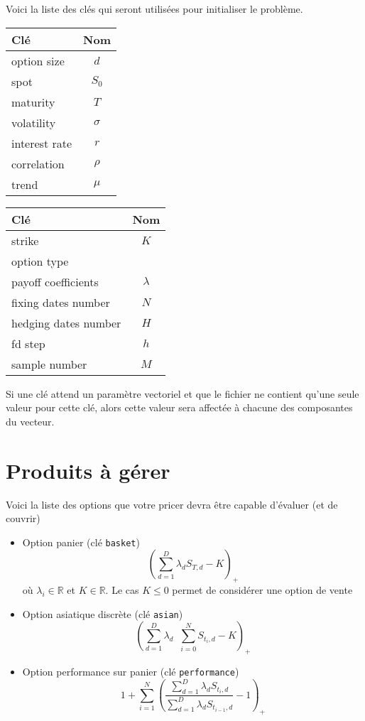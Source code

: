 \documentclass[a4paper,11pt]{article}
\def\R{{\mathbb R}}
\def\inv#1{\mathop{\frac{1}{ #1}}\nolimits}
\begin{document}
Voici la liste des clés qui seront utilisées pour initialiser le problème.
\begin{multicols}{2}
\begin{center}
  \begin{tabular}{l@{$\quad$}|@{$\quad$}c}
    Clé &  Nom\\
    \hline
    option size &  $d$ \\
    spot & $S_0$\\
    maturity & $T$\\
    volatility & $\sigma$\\
    interest rate & $r$ \\
    correlation & $\rho$\\
    trend & $\mu$ \\
  \end{tabular}

  \begin{tabular}{l@{$\quad$}|@{$\quad$}c}
    Clé & Nom\\
    \hline
    strike & $K$\\
    option type & \\
    payoff coefficients &$\lambda$ \\
    fixing dates number &$N$ \\
    hedging dates number &$H$ \\
    fd step &$h$ \\
    sample number &$M$
  \end{tabular}
\end{center}
\end{multicols}
Si une clé attend un paramètre vectoriel et que le fichier ne contient qu'une seule valeur pour cette clé, alors cette valeur sera affectée à chacune des composantes du vecteur.


\section{Produits à gérer}
\label{sec:options}

Voici la liste des options que votre pricer devra être capable d'évaluer (et de couvrir)
\begin{itemize}
\item Option panier (clé \verb!basket!)
  \begin{equation*}
    \left( \sum_{d=1}^D \lambda_d S_{T,d} - K \right)_+
  \end{equation*}
  où $\lambda_i \in \R$ et $K \in \R$. Le cas $K \le 0$ permet de considérer une
  option de vente

\item Option asiatique discrète (clé \verb!asian!)
  \begin{equation*}
    \left(\sum_{d=1}^D \lambda_d \inv{N+1} \sum_{i=0}^{N} S_{t_i,d} - K\right)_+
  \end{equation*}

\item Option performance sur panier (clé \verb!performance!)
  \begin{equation*}
    1 + \sum_{i=1}^N \left( \frac{\sum_{d=1}^D \lambda_d
        S_{t_i,d}}{\sum_{d=1}^D \lambda_d
        S_{t_{i-1},d}} - 1 \right)_+
  \end{equation*}
\end{itemize}
\end{document}
